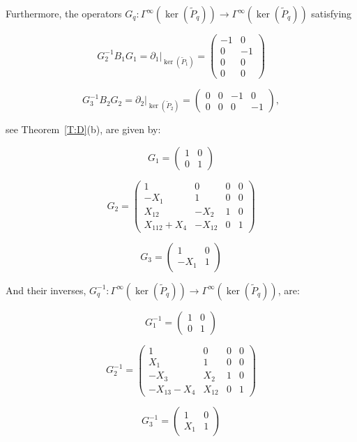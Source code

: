 \documentclass[reqno,12pt]{amsart}
\theoremstyle{plain}
\theoremstyle{definition}
\begin{document}
Furthermore, the operators $G_q\colon\Gamma^\infty(\ker(\tilde P_q))\to\Gamma^\infty(\ker(\tilde P_q))$ satisfying

$$
G_2^{-1}B_1G_1=\partial_1|_{\ker(\tilde P_1)}=\left(\begin{array}{c|c}
-1&0\\\hline
0& -1\\\hline
0& 0\\\hline
0& 0  
\end{array}\right)
$$

$$
G_3^{-1}B_2G_2=\partial_2|_{\ker(\tilde P_2)}=\left(\begin{array}{c|c|c|c}
0&0&-1&0\\\hline
0&0&0& -1
\end{array}\right),
$$

see Theorem~\ref{T:D}(b), are given by:

$$
G_1=\left(\begin{array}{c|c}
1&0\\\hline
0&1 
\end{array}\right)
$$

$$
G_2=\left(\begin{array}{c|c|c|c}
1&         0&     0&0\\\hline
-X_1&       1&     0&0\\\hline
X_{12}&     -X_2&   1&0\\\hline
X_{112}+X_4&-X_{12}&0&1 
\end{array}\right)
$$

$$
G_3=\left(\begin{array}{c|c}
1&  0\\\hline
-X_1&1 
\end{array}\right)
$$

And their inverses, $G_q^{-1}\colon\Gamma^\infty(\ker(\tilde P_q))\to\Gamma^\infty(\ker(\tilde P_q))$, are:

$$
G^{-1}_1=\left(\begin{array}{c|c}
1&0\\\hline
0&1 
\end{array}\right)
$$

$$
G^{-1}_2=\left(\begin{array}{c|c|c|c}
1&        0&    0&0\\\hline
X_1&       1&    0&0\\\hline
-X_3&      X_2&   1&0\\\hline
-X_{13}-X_4&X_{12}&0&1 
\end{array}\right)
$$

$$
G^{-1}_3=\left(\begin{array}{c|c}
1& 0\\\hline
X_1&1 
\end{array}\right)
$$
\end{document}
